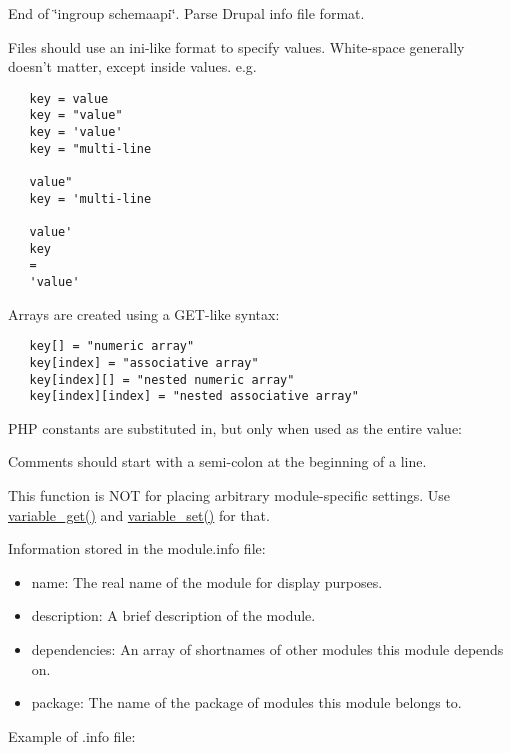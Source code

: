 End of \char`\"{}ingroup schemaapi\char`\"{}. Parse Drupal info file format.

Files should use an ini-like format to specify values. White-space generally doesn't matter, except inside values. e.g.



\begin{Code}\begin{verbatim}   key = value
   key = "value"
   key = 'value'
   key = "multi-line

   value"
   key = 'multi-line

   value'
   key
   =
   'value'
\end{verbatim}
\end{Code}



Arrays are created using a GET-like syntax:



\begin{Code}\begin{verbatim}   key[] = "numeric array"
   key[index] = "associative array"
   key[index][] = "nested numeric array"
   key[index][index] = "nested associative array"
\end{verbatim}
\end{Code}



PHP constants are substituted in, but only when used as the entire value:

Comments should start with a semi-colon at the beginning of a line.

This function is NOT for placing arbitrary module-specific settings. Use \hyperlink{bootstrap_8inc_ba5d67193d1f9d9fd4636cff54fc4154}{variable\_\-get()} and \hyperlink{bootstrap_8inc_9859faa6fcd56ca6048be93dace95999}{variable\_\-set()} for that.

Information stored in the module.info file:\begin{itemize}
\item name: The real name of the module for display purposes.\item description: A brief description of the module.\item dependencies: An array of shortnames of other modules this module depends on.\item package: The name of the package of modules this module belongs to.\end{itemize}


Example of .info file: 

